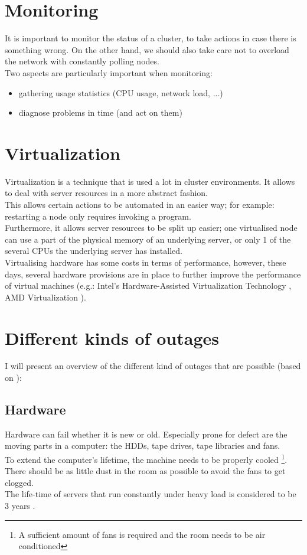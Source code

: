 \documentclass[12pt]{report}
\begin{document}
\section{Monitoring}
It is important to monitor the status of a cluster, to take actions in
case there is something wrong. On the other hand, we should also take
care not to overload the network with constantly polling nodes.\\
Two aspects are particularly important when monitoring: 
\begin{itemize}
\item gathering usage statistics (CPU usage, network load, ...)
\item diagnose problems in time (and act on them)
\end{itemize}

\section{Virtualization}
Virtualization is a technique that is used a lot in cluster
environments. It allows to deal with server resources in a more
abstract fashion.\\
This allows certain actions to be automated in an easier way;
for example: restarting a node only requires invoking a program.\\
Furthermore, it allows server resources to be split up easier; one
virtualised node can use a part of the physical memory of an
underlying server, or only 1 of the several CPUs the underlying server
has installed.\\
Virtualising hardware has some costs in terms of performance, however,
these days, several hardware provisions are in place to further
improve the performance of virtual machines (e.g.: Intel's Hardware-Assisted
Virtualization Technology \cite{intel_havt}, AMD Virtualization
\cite{amd_virt}).

\section{Different kinds of outages}
I will present an overview of the different kind of outages that are
possible (based on \cite{ha_book}):
\subsection{Hardware}
Hardware can fail whether it is new or old. Especially prone for
defect are the moving parts in a computer: the HDDs, tape drives,
tape libraries and fans.\\
To extend the computer's lifetime, the machine needs to be properly
cooled \footnote{A sufficient amount of fans is required and the room needs to
be air conditioned}. \\
There should be as little dust in the room as possible to avoid the
fans to get clogged.\\
The life-time of servers that run constantly under heavy load is
considered to be 3 years \cite{ms_cloud_cost}.
\end{document}
